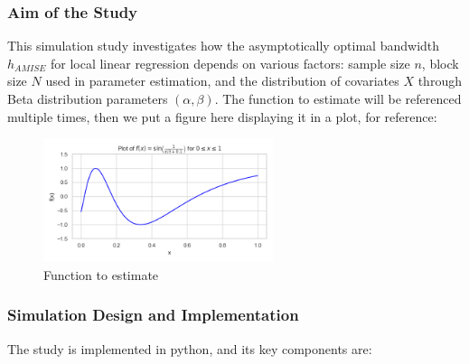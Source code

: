 \documentclass{article}
\begin{document}
\subsubsection*{Aim of the Study}
This simulation study investigates how the asymptotically optimal bandwidth $h_{AMISE}$ for local linear regression depends on various factors: sample size $n$, block size $N$ used in parameter estimation, and the distribution of covariates $X$ through Beta distribution parameters $(\alpha, \beta)$.
The function to estimate will be referenced multiple times, then we put a figure here displaying it in a plot, for reference:
\begin{figure}[H]
\centering
\includegraphics[width=0.6\textwidth]{real_y.png}
\caption{Function to estimate}
\label{fig:y_real}
\end{figure}

\subsubsection*{Simulation Design and Implementation}
The study is implemented in python, and its key components are:
\end{document}
